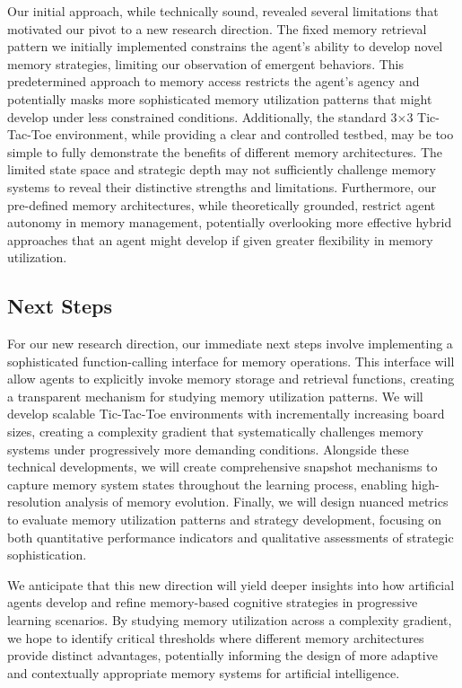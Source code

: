 \documentclass{article}
\begin{document}
Our initial approach, while technically sound, revealed several limitations that motivated our pivot to a new research direction. The fixed memory retrieval pattern we initially implemented constrains the agent's ability to develop novel memory strategies, limiting our observation of emergent behaviors. This predetermined approach to memory access restricts the agent's agency and potentially masks more sophisticated memory utilization patterns that might develop under less constrained conditions. Additionally, the standard 3×3 Tic-Tac-Toe environment, while providing a clear and controlled testbed, may be too simple to fully demonstrate the benefits of different memory architectures. The limited state space and strategic depth may not sufficiently challenge memory systems to reveal their distinctive strengths and limitations. Furthermore, our pre-defined memory architectures, while theoretically grounded, restrict agent autonomy in memory management, potentially overlooking more effective hybrid approaches that an agent might develop if given greater flexibility in memory utilization.

\subsection{Next Steps}

For our new research direction, our immediate next steps involve implementing a sophisticated function-calling interface for memory operations. This interface will allow agents to explicitly invoke memory storage and retrieval functions, creating a transparent mechanism for studying memory utilization patterns. We will develop scalable Tic-Tac-Toe environments with incrementally increasing board sizes, creating a complexity gradient that systematically challenges memory systems under progressively more demanding conditions. Alongside these technical developments, we will create comprehensive snapshot mechanisms to capture memory system states throughout the learning process, enabling high-resolution analysis of memory evolution. Finally, we will design nuanced metrics to evaluate memory utilization patterns and strategy development, focusing on both quantitative performance indicators and qualitative assessments of strategic sophistication.

We anticipate that this new direction will yield deeper insights into how artificial agents develop and refine memory-based cognitive strategies in progressive learning scenarios. By studying memory utilization across a complexity gradient, we hope to identify critical thresholds where different memory architectures provide distinct advantages, potentially informing the design of more adaptive and contextually appropriate memory systems for artificial intelligence.
\end{document}
